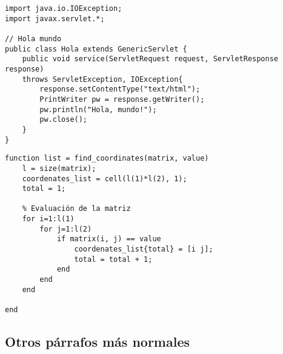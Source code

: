 \lstset{style=Java}
\begin{lstlisting}[caption=Ejemplo en Java]
import java.io.IOException; 
import javax.servlet.*;

// Hola mundo
public class Hola extends GenericServlet {
	public void service(ServletRequest request, ServletResponse response)
	throws ServletException, IOException{
		response.setContentType("text/html");
		PrintWriter pw = response.getWriter();
		pw.println("Hola, mundo!");
		pw.close();
	}
}
\end{lstlisting}

\lstset{style=Matlab}
\begin{lstlisting}[caption=Ejemplo en Matlab]
function list = find_coordinates(matrix, value)
	l = size(matrix);
	coordenates_list = cell(l(1)*l(2), 1);
	total = 1;

	% Evaluación de la matriz
	for i=1:l(1)
		for j=1:l(2)
			if matrix(i, j) == value
				coordenates_list{total} = [i j];
				total = total + 1;
			end
		end
	end

end
\end{lstlisting}
	
	\subsection{Otros párrafos más normales}
		
		\lipsum[7]
		
		\newp \lipsum[2]
		
		
		\begin{multicols}{2}
			
			\lipsum[4]
			
			
			\lipsum[5]
			
		\end{multicols}
		
		\lipsum[1]


